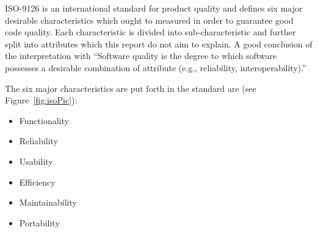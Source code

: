 ISO-9126 is an international standard for product quality and defines six major desirable characteristics which ought to measured in order to guarantee good code quality. Each characteristic is divided into sub-characteristic and further split into attributes which this report do not aim to explain. A good conclusion of the interpretation with 
“Software quality is the degree to which software possesses a desirable combination of attribute (e.g., reliability, interoperability).”~\cite{ISO1061}

The six major characteristics are put forth in the standard are (see Figure~\ref{fig:isoPic}): 
\begin{itemize}
\item Functionality 
\item Reliability
\item Usability
\item Efficiency
\item Maintainability
\item Portability
\end{itemize}